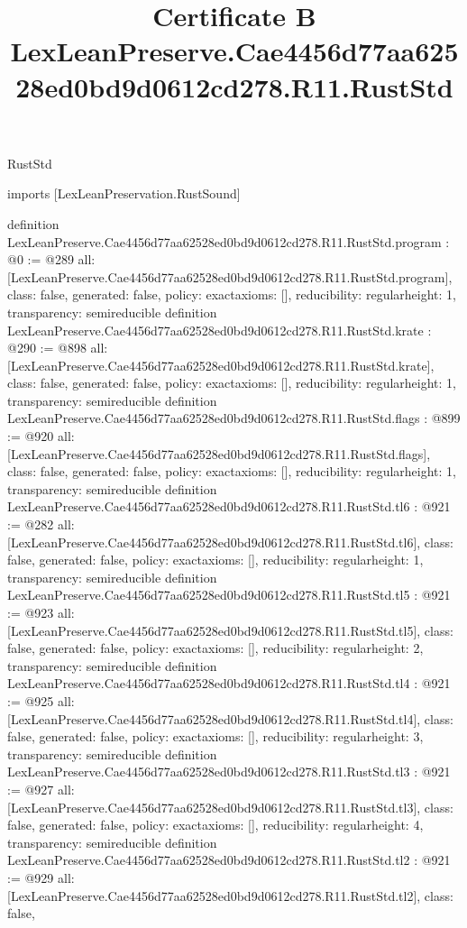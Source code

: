 \begin{lexlean}{RustStd}
\title{Certificate B LexLeanPreserve.Cae4456d77aa62528ed0bd9d0612cd278.R11.RustStd}
\begin{coremodule}
imports [LexLeanPreservation.RustSound]

definition LexLeanPreserve.Cae4456d77aa62528ed0bd9d0612cd278.R11.RustStd.program : @0 := @289 {
  all: [LexLeanPreserve.Cae4456d77aa62528ed0bd9d0612cd278.R11.RustStd.program],
  class: false,
  generated: false,
  policy: exact{axioms: []},
  reducibility: regular{height: 1},
  transparency: semireducible
}
definition LexLeanPreserve.Cae4456d77aa62528ed0bd9d0612cd278.R11.RustStd.krate : @290 := @898 {
  all: [LexLeanPreserve.Cae4456d77aa62528ed0bd9d0612cd278.R11.RustStd.krate],
  class: false,
  generated: false,
  policy: exact{axioms: []},
  reducibility: regular{height: 1},
  transparency: semireducible
}
definition LexLeanPreserve.Cae4456d77aa62528ed0bd9d0612cd278.R11.RustStd.flags : @899 := @920 {
  all: [LexLeanPreserve.Cae4456d77aa62528ed0bd9d0612cd278.R11.RustStd.flags],
  class: false,
  generated: false,
  policy: exact{axioms: []},
  reducibility: regular{height: 1},
  transparency: semireducible
}
definition LexLeanPreserve.Cae4456d77aa62528ed0bd9d0612cd278.R11.RustStd.tl6 : @921 := @282 {
  all: [LexLeanPreserve.Cae4456d77aa62528ed0bd9d0612cd278.R11.RustStd.tl6],
  class: false,
  generated: false,
  policy: exact{axioms: []},
  reducibility: regular{height: 1},
  transparency: semireducible
}
definition LexLeanPreserve.Cae4456d77aa62528ed0bd9d0612cd278.R11.RustStd.tl5 : @921 := @923 {
  all: [LexLeanPreserve.Cae4456d77aa62528ed0bd9d0612cd278.R11.RustStd.tl5],
  class: false,
  generated: false,
  policy: exact{axioms: []},
  reducibility: regular{height: 2},
  transparency: semireducible
}
definition LexLeanPreserve.Cae4456d77aa62528ed0bd9d0612cd278.R11.RustStd.tl4 : @921 := @925 {
  all: [LexLeanPreserve.Cae4456d77aa62528ed0bd9d0612cd278.R11.RustStd.tl4],
  class: false,
  generated: false,
  policy: exact{axioms: []},
  reducibility: regular{height: 3},
  transparency: semireducible
}
definition LexLeanPreserve.Cae4456d77aa62528ed0bd9d0612cd278.R11.RustStd.tl3 : @921 := @927 {
  all: [LexLeanPreserve.Cae4456d77aa62528ed0bd9d0612cd278.R11.RustStd.tl3],
  class: false,
  generated: false,
  policy: exact{axioms: []},
  reducibility: regular{height: 4},
  transparency: semireducible
}
definition LexLeanPreserve.Cae4456d77aa62528ed0bd9d0612cd278.R11.RustStd.tl2 : @921 := @929 {
  all: [LexLeanPreserve.Cae4456d77aa62528ed0bd9d0612cd278.R11.RustStd.tl2],
  class: false,
}
\end{coremodule}
\end{lexlean}
